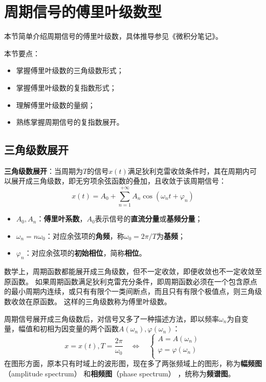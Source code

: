\section{周期信号的傅里叶级数型}

本节简单介绍周期信号的傅里叶级数，具体推导参见《微积分笔记》。

本节要点：
\begin{itemize}
    \item 掌握傅里叶级数的三角级数形式；
    \item 掌握傅里叶级数的复指数形式；
    \item 理解傅里叶级数的量纲；
    \item 熟练掌握周期信号的复指数展开。
\end{itemize}

\subsection{三角级数展开}

{\bf 三角级数展开}：当周期为$T$的信号$x\left( t \right) $满足狄利克雷收敛条件时，其在周期内可以展开成三角级数，即无穷项余弦函数的叠加，且收敛于该周期信号：
\[
x\left( t \right) =A_0+\sum_{n=1}^{+\infty}{A_n\cos \left( \omega _nt+\varphi _n \right)}
\]
\begin{itemize}
    \item $A_0,A_n$：{\bf 傅里叶系数}，$A_0$表示信号的{\bf 直流分量}或{\bf 基频分量}；
    \item $\omega _n=n\omega _0$：对应余弦项的{\bf 角频}，称$\omega _0=2\pi /T$为{\bf 基频}；
    \item $\varphi _n$：对应余弦项的{\bf 初始相位}，简称{\bf 相位}。
\end{itemize}

数学上，周期函数都能展开成三角级数，但不一定收敛，即便收敛也不一定收敛至原函数。
如果周期函数满足狄利克雷充分条件，即周期函数必须在一个包含原点的最小周期内连续，或只有有限个一类间断点，而且只有有限个极值点，则三角级数收敛在原函数。
这样的三角级数称为傅里叶级数。

周期信号展开成三角级数后，对信号又多了一种描述方法，即以频率$\omega _n$为自变量，幅值和初相为因变量的两个函数$A\left( \omega _n \right) ,\varphi \left( \omega _n \right) $：
\[
x=x\left( t \right) ,T=\frac{2\pi}{\omega _0} \quad \Leftrightarrow \quad \begin{cases}
	A=A\left( \omega _n \right)\\
	\varphi =\varphi \left( \omega _n \right)\\
\end{cases}
\]
在图形方面，原本只有时域上的波形图，现在多了两张频域上的图形，称为{\bf 幅频图}（amplitude spectrum） 和{\bf 相频图}（phase spectrum） ，统称为{\bf 频谱图}。

